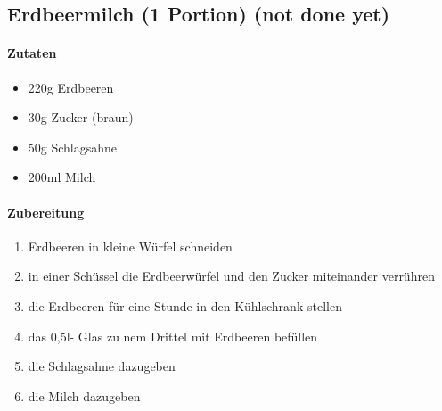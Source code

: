 \newpage
\subsection{Erdbeermilch (1 Portion) (not done yet)}
\paragraph{Zutaten}
\begin{itemize}[noitemsep]
	\item 220g Erdbeeren
	\item 30g Zucker (braun)
	\item 50g Schlagsahne
	\item 200ml Milch
\end{itemize}
\paragraph{Zubereitung}
\begin{enumerate}[noitemsep]
	\item Erdbeeren in kleine Würfel schneiden
	\item in einer Schüssel die Erdbeerwürfel und den Zucker miteinander verrühren
	\item die Erdbeeren für eine Stunde in den Kühlschrank stellen 
	\item  das 0,5l- Glas zu nem Drittel mit Erdbeeren befüllen
	\item die Schlagsahne dazugeben
	\item die Milch dazugeben 
\end{enumerate}